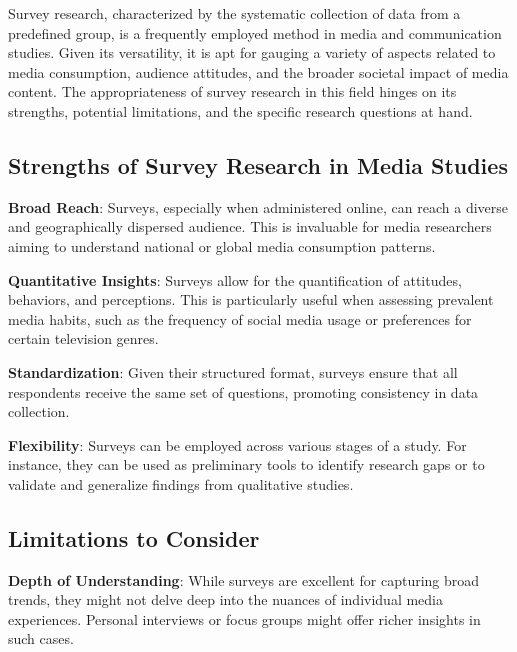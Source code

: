 \documentclass[
  b5paper]{book}
\begin{document}
Survey research, characterized by the systematic collection of data from a predefined group, is a frequently employed method in media and communication studies.
Given its versatility, it is apt for gauging a variety of aspects related to media consumption, audience attitudes, and the broader societal impact of media content.
The appropriateness of survey research in this field hinges on its strengths, potential limitations, and the specific research questions at hand.

\hypertarget{strengths-of-survey-research-in-media-studies}{%
\subsection*{Strengths of Survey Research in Media Studies}\label{strengths-of-survey-research-in-media-studies}}

\textbf{Broad Reach}: Surveys, especially when administered online, can reach a diverse and geographically dispersed audience.
This is invaluable for media researchers aiming to understand national or global media consumption patterns.

\textbf{Quantitative Insights}: Surveys allow for the quantification of attitudes, behaviors, and perceptions.
This is particularly useful when assessing prevalent media habits, such as the frequency of social media usage or preferences for certain television genres.

\textbf{Standardization}: Given their structured format, surveys ensure that all respondents receive the same set of questions, promoting consistency in data collection.

\textbf{Flexibility}: Surveys can be employed across various stages of a study.
For instance, they can be used as preliminary tools to identify research gaps or to validate and generalize findings from qualitative studies.

\hypertarget{limitations-to-consider}{%
\subsection*{Limitations to Consider}\label{limitations-to-consider}}

\textbf{Depth of Understanding}: While surveys are excellent for capturing broad trends, they might not delve deep into the nuances of individual media experiences.
Personal interviews or focus groups might offer richer insights in such cases.
\end{document}
